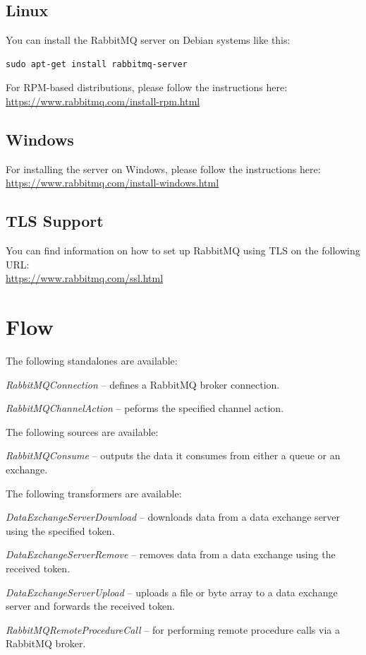 \documentclass[a4paper]{book}
\begin{document}
\section{Linux}
You can install the RabbitMQ server on Debian systems like this:
\begin{verbatim}
sudo apt-get install rabbitmq-server
\end{verbatim}

\noindent For RPM-based distributions, please follow the instructions here: \\
\url{https://www.rabbitmq.com/install-rpm.html}{}

\section{Windows}
For installing the server on Windows, please follow the instructions here: \\
\url{https://www.rabbitmq.com/install-windows.html}{}

\section{TLS Support}
\label{tls_support}
You can find information on how to set up RabbitMQ using TLS on the
following URL: \\
\url{https://www.rabbitmq.com/ssl.html}{}


\chapter{Flow}
The following standalones are available:
\begin{tight_itemize}
  \item \textit{RabbitMQConnection} -- defines a RabbitMQ broker connection.
  \item \textit{RabbitMQChannelAction} -- peforms the specified channel action.
\end{tight_itemize}

\noindent The following sources are available:
\begin{tight_itemize}
  \item \textit{RabbitMQConsume} -- outputs the data it consumes from either
  a queue or an exchange.
\end{tight_itemize}

\noindent The following transformers are available:
\begin{tight_itemize}
  \item \textit{DataExchangeServerDownload} -- downloads data from a data exchange
  server using the specified token.
  \item \textit{DataExchangeServerRemove} -- removes data from a data exchange
  using the received token.
  \item \textit{DataExchangeServerUpload} -- uploads a file or byte array to a data exchange
  server and forwards the received token.
  \item \textit{RabbitMQRemoteProcedureCall} -- for performing remote procedure
  calls via a RabbitMQ broker.
\end{tight_itemize}
\end{document}
